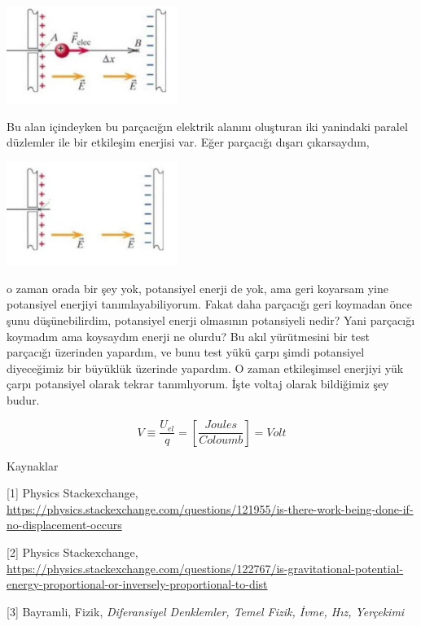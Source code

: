 \documentclass[12pt,fleqn]{article}\usepackage{../../common}
\begin{document}
\includegraphics[width=15em]{08_08.jpg}

Bu alan içindeyken bu parçacığın elektrik alanını oluşturan iki yanindaki
paralel düzlemler ile bir etkileşim enerjisi var. Eğer parçacığı dışarı
çıkarsaydım,

\includegraphics[width=15em]{08_09.jpg}

o zaman orada bir şey yok, potansiyel enerji de yok, ama geri koyarsam yine
potansiyel enerjiyi tanımlayabiliyorum. Fakat daha parçacığı geri koymadan önce
şunu düşünebilirdim, potansiyel enerji olmasının potansiyeli nedir? Yani
parçacığı koymadım ama koysaydım enerji ne olurdu? Bu akıl yürütmesini bir test
parçacığı üzerinden yapardım, ve bunu test yükü çarpı şimdi potansiyel
diyeceğimiz bir büyüklük üzerinde yapardım. O zaman etkileşimsel enerjiyi yük
çarpı potansiyel olarak tekrar tanımlıyorum. İşte voltaj olarak bildiğimiz şey
budur.

$$
V \equiv \frac{U_{el}}{q} = \left[ \frac{Joules}{Coloumb} \right] = Volt
$$

Kaynaklar

[1] Physics Stackexchange, \url{https://physics.stackexchange.com/questions/121955/is-there-work-being-done-if-no-displacement-occurs}

[2] Physics Stackexchange, \url{https://physics.stackexchange.com/questions/122767/is-gravitational-potential-energy-proportional-or-inversely-proportional-to-dist}

[3] Bayramli, Fizik, {\em Diferansiyel Denklemler, Temel Fizik, İvme, Hız, Yerçekimi}
\end{document}
